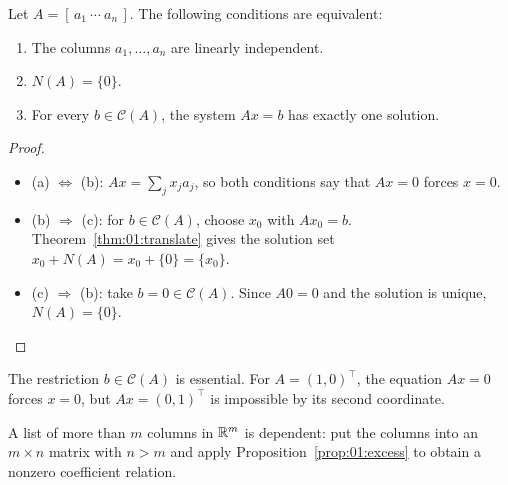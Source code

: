 \begin{theorem}\label{thm:01:independence}
Let \(A=[\,a_1\ \cdots\ a_n\,]\). The following conditions are equivalent:
\begin{enumerate}
\item The columns \(a_1,\ldots,a_n\) are linearly independent.
\item \(N(A)=\{0\}\).
\item For every \(b\in\mathcal C(A)\), the system \(Ax=b\) has exactly one solution.
\end{enumerate}
\end{theorem}
\begin{proof}
\begin{itemize}
\item (a) \(\Longleftrightarrow\) (b): \(Ax=\sum_jx_ja_j\), so both conditions
say that \(Ax=0\) forces \(x=0\).
\item (b) \(\Longrightarrow\) (c): for \(b\in\mathcal C(A)\), choose \(x_0\)
with \(Ax_0=b\). Theorem~\ref{thm:01:translate} gives the solution set
\(x_0+N(A)=x_0+\{0\}=\{x_0\}\).
\item (c) \(\Longrightarrow\) (b): take \(b=0\in\mathcal C(A)\).
Since \(A0=0\) and the solution is unique, \(N(A)=\{0\}\).
\end{itemize}
\end{proof}
The restriction \(b\in\mathcal C(A)\) is essential. For
\(A=(1,0)^\top\), the equation \(Ax=0\) forces \(x=0\), but
\(Ax=(0,1)^\top\) is impossible by its second coordinate.

A list of more than \(m\) columns in \(\mathbb R^m\) is dependent:
put the columns into an \(m\times n\) matrix with \(n>m\) and apply
Proposition~\ref{prop:01:excess} to obtain a nonzero coefficient relation.

